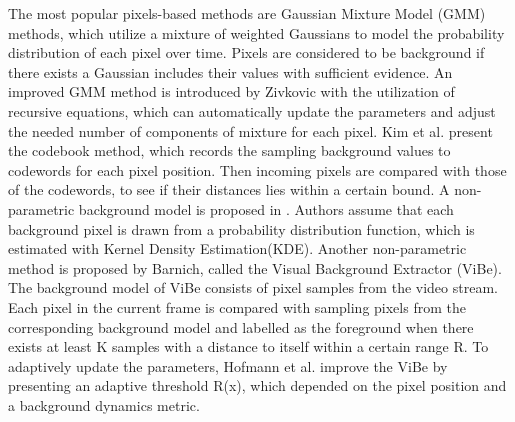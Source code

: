 \documentclass[journal]{IEEEtran}
\begin{document}
The most popular pixels-based methods are Gaussian Mixture Model (GMM) methods\cite{Stauffer1999}, which utilize a mixture of weighted Gaussians to model the probability distribution of each pixel over time. Pixels are considered to be background if there exists a Gaussian includes their values with sufficient evidence. 
An improved GMM method is introduced by Zivkovic\cite{Zivkovic2004} with the utilization of recursive equations, which can automatically update the parameters and adjust the needed number of components of mixture for each pixel. 
%
Kim et al.\cite{Kim2005} present the codebook method, which records the sampling background values to codewords for each pixel position.  
Then incoming pixels are compared with those of the codewords, to see if their distances lies within a certain bound. 
A non-parametric background model is proposed in \cite{Elgammal2000Non}. Authors assume that each background pixel is drawn from a probability distribution function, which is estimated with Kernel Density Estimation(KDE). 
Another non-parametric method is proposed by Barnich\cite{Barnich2011_2011_TIP}, called the Visual Background Extractor (ViBe). The background model of ViBe consists of pixel samples from the video stream. Each pixel in the current frame is compared with sampling pixels from the corresponding background model and labelled as the foreground when there exists at least K samples with a distance to itself within a certain range R. 
%
%
To adaptively update the parameters, Hofmann et al.\cite{Hofmann2012Background} improve the ViBe by presenting an adaptive threshold R(x), which depended on the pixel position and a background dynamics metric.
\end{document}
